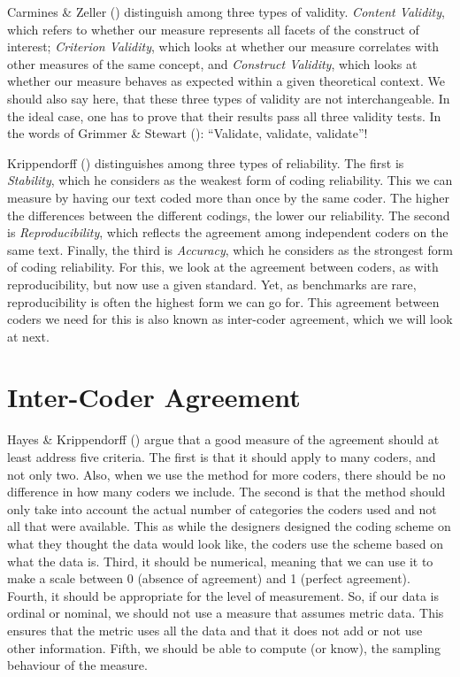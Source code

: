 \documentclass[
]{book}
\begin{document}
Carmines \& Zeller () distinguish among three types of validity. \emph{Content Validity}, which refers to whether our measure represents all facets of the construct of interest; \emph{Criterion Validity}, which looks at whether our measure correlates with other measures of the same concept, and \emph{Construct Validity}, which looks at whether our measure behaves as expected within a given theoretical context. We should also say here, that these three types of validity are not interchangeable. In the ideal case, one has to prove that their results pass all three validity tests. In the words of Grimmer \& Stewart (): ``Validate, validate, validate''!

Krippendorff () distinguishes among three types of reliability. The first is \emph{Stability}, which he considers as the weakest form of coding reliability. This we can measure by having our text coded more than once by the same coder. The higher the differences between the different codings, the lower our reliability. The second is \emph{Reproducibility}, which reflects the agreement among independent coders on the same text. Finally, the third is \emph{Accuracy}, which he considers as the strongest form of coding reliability. For this, we look at the agreement between coders, as with reproducibility, but now use a given standard. Yet, as benchmarks are rare, reproducibility is often the highest form we can go for. This agreement between coders we need for this is also known as inter-coder agreement, which we will look at next.

\section{Inter-Coder Agreement}\label{inter-coder-agreement}

Hayes \& Krippendorff () argue that a good measure of the agreement should at least address five criteria. The first is that it should apply to many coders, and not only two. Also, when we use the method for more coders, there should be no difference in how many coders we include. The second is that the method should only take into account the actual number of categories the coders used and not all that were available. This as while the designers designed the coding scheme on what they thought the data would look like, the coders use the scheme based on what the data is. Third, it should be numerical, meaning that we can use it to make a scale between 0 (absence of agreement) and 1 (perfect agreement). Fourth, it should be appropriate for the level of measurement. So, if our data is ordinal or nominal, we should not use a measure that assumes metric data. This ensures that the metric uses all the data and that it does not add or not use other information. Fifth, we should be able to compute (or know), the sampling behaviour of the measure.
\end{document}
